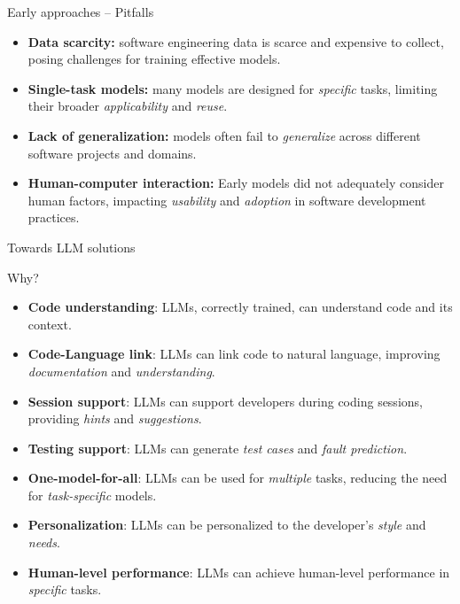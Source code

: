 \documentclass[presentation, 10pt]{beamer}\mode<presentation>{\usetheme{AMSBolognaFC}}
\begin{document}
\begin{frame}{Early approaches -- Pitfalls}
	\begin{itemize}
		\item \textbf{Data scarcity:} software engineering data is scarce and expensive to collect, posing challenges for training effective models.
		\item \textbf{Single-task models:} many models are designed for \emph{specific} tasks, limiting their broader \emph{applicability} and \emph{reuse}.
		\item \textbf{Lack of generalization:} models often fail to \emph{generalize} across different software projects and domains.
		\item \textbf{Human-computer interaction:} Early models did not adequately consider human factors, impacting \emph{usability} and \emph{adoption} in software development practices.
	\end{itemize}
\end{frame}
\begin{frame}{Towards LLM solutions}
	\begin{exampleblock}{Why?}
		\begin{itemize}
			\item \textbf{Code understanding}: LLMs, correctly trained, can understand code and its context.
			\item \textbf{Code-Language link}: LLMs can link code to natural language, improving \emph{documentation} and \emph{understanding}.
			\item \textbf{Session support}: LLMs can support developers during coding sessions, providing \emph{hints} and \emph{suggestions}.
			\item \textbf{Testing support}: LLMs can generate \emph{test cases} and \emph{fault prediction}.
			\item \textbf{One-model-for-all}: LLMs can be used for \emph{multiple} tasks, reducing the need for \emph{task-specific} models.
			\item \textbf{Personalization}: LLMs can be personalized to the developer's \emph{style} and \emph{needs}.
			\item \textbf{Human-level performance}: LLMs can achieve human-level performance in \emph{specific} tasks.
		\end{itemize}
	\end{exampleblock}
\end{frame}
\end{document}
